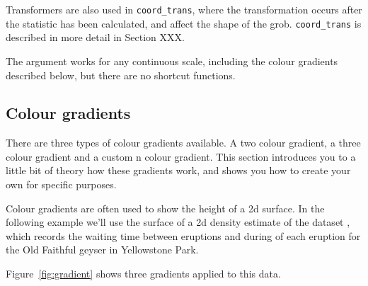 Transformers are also used in \verb|coord_trans|, where the transformation occurs after the statistic has been calculated, and affect the shape of the grob.  \verb|coord_trans| is described in more detail in Section XXX.

The  argument works for any continuous scale, including the colour gradients described below, but there are no shortcut functions.

\subsection{Colour gradients}
\label{sub:scale-gradient}

There are three types of colour gradients available.  A two colour gradient, a three colour gradient and a custom n colour gradient.  This section introduces you to a little bit of theory how these gradients work, and shows you how to create your own for specific purposes.



Colour gradients are often used to show the height of a 2d surface.  In the following example we'll use the surface of a 2d density estimate of the  dataset \citep{azzalini:1990}, which records the waiting time between eruptions and during of each eruption for the Old Faithful geyser in Yellowstone Park.  

Figure~\ref{fig:gradient} shows three gradients applied to this data.


